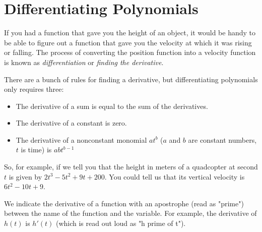 \chapter{Differentiating Polynomials}

If you had a function that gave you the height of an object, it would
be handy to be able to figure out a function that gave you the
velocity at which it was rising or falling. The process of converting
the position function into a velocity function is known as
\emph{differentiation} or \emph{finding the derivative}.

There are a bunch of rules for finding a derivative, but
differentiating polynomials only requires three:
\begin{itemize}
\item The derivative of a sum is equal to the sum of the derivatives.
\item The derivative of a constant is zero.
\item The derivative of a nonconstant monomial $at^b$ ($a$ and $b$ are constant numbers, $t$ is time) is $abt^{b-1}$ 
\end{itemize}

So, for example, if we tell you that the height in meters of a quadcopter
at second $t$ is given by $2t^3 - 5t^2 + 9t + 200$. You could tell us
that its vertical velocity is $6t^{2} - 10t + 9$.

We indicate the derivative of a function with an apostrophe (read as "prime") between the name of the function and the variable. For example, the derivative of $h(t)$ is $h'(t)$ (which is read out loud as "h prime of t"). 

